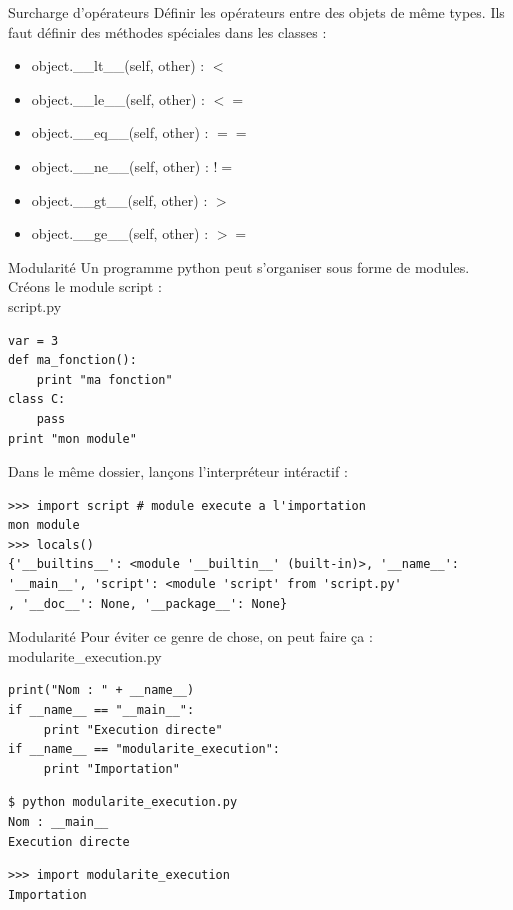 \documentclass{beamer}
\begin{document}
\begin{frame}[fragile]{Surcharge d'opérateurs}
Définir les opérateurs entre des objets de même types. Ils faut définir des méthodes spéciales dans les classes :
\begin{itemize}
 \item object.\_\_lt\_\_(self, other) : $<$
 \item object.\_\_le\_\_(self, other) : $<=$
 \item object.\_\_eq\_\_(self, other) : $==$
 \item object.\_\_ne\_\_(self, other) : $!=$
 \item object.\_\_gt\_\_(self, other) : $>$
 \item object.\_\_ge\_\_(self, other) : $>=$
\end{itemize}
\end{frame}


\begin{frame}[fragile]{Modularité}
Un programme python peut s'organiser sous forme de modules.\\
Créons le module script :\\
script.py\\
\begin{lstlisting}
var = 3
def ma_fonction():
    print "ma fonction"
class C:
    pass
print "mon module"
\end{lstlisting}
Dans le même dossier, lançons l'interpréteur intéractif :
\begin{lstlisting}[basicstyle=\tiny]
>>> import script # module execute a l'importation
mon module
>>> locals()
{'__builtins__': <module '__builtin__' (built-in)>, '__name__':
'__main__', 'script': <module 'script' from 'script.py'
, '__doc__': None, '__package__': None}
\end{lstlisting}
\end{frame}

\begin{frame}[fragile]{Modularité}
Pour éviter ce genre de chose, on peut faire ça :
modularite\_execution.py
\begin{lstlisting}
print("Nom : " + __name__)
if __name__ == "__main__":
     print "Execution directe"
if __name__ == "modularite_execution":
     print "Importation"
\end{lstlisting}
\begin{lstlisting}[language=bash]
$ python modularite_execution.py 
Nom : __main__
Execution directe
\end{lstlisting}
\begin{lstlisting}
>>> import modularite_execution
Importation
\end{lstlisting}
\end{frame}
\end{document}
